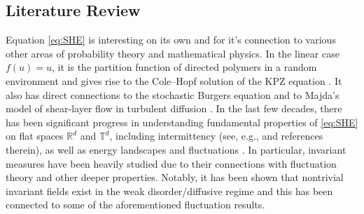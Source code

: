 \documentclass{article}
\numberwithin{theorem}{section}
\def\RR{\mathbb{R}} %
\def\TT{\mathbb{T}} %
\begin{document}
\subsection{Literature Review}

Equation \eqref{eq:SHE} is interesting on its own\cite{Molchanov1991IdeasIT} and for it's connection to various other areas of probability theory and mathematical physics. In the linear case $f(u)=u$, it is the partition function of directed polymers in a random environment\cite{ACQ11,Comets2004DirectedPI,Cosco2020DirectedPO,DasZhu,DGLpolymer} and gives rise to the Cole--Hopf solution of the KPZ equation \cite{ Ka87, KPZ86}. It also has direct connections to the stochastic Burgers equation \cite{BCJ94,BertiniGiacomin97,CM94} and to Majda’s model of shear-layer flow in turbulent diffusion \cite{Mj93}. In the last few decades, there has been significant progress in understanding fundamental properties of \eqref{eq:SHE} on flat spaces \(\RR^d\) and \(\TT^d\), including intermittency (see, e.g., \cite{ChenKim19, Kh14} and references therein), as well as energy landscapes and fluctuations \cite{DGK23,GHL25,GK24,GL20}. In particular, invariant measures have been heavily studied\cite{COTX25,DGRZ18,DM24,DE24,GQ24,GRSS25} due to their connections with fluctuation theory and other deeper properties. Notably, it has been shown that nontrivial invariant fields exist in the weak disorder/diffusive regime and this has been connected to some of the aforementioned fluctuation results.
\end{document}
